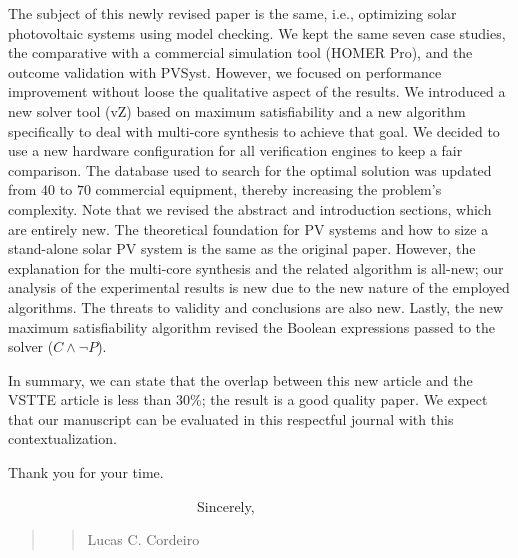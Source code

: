 \documentclass[11pt]{article}
\newcommand\vi{\vspace{\baselineskip}}
\begin{document}
The subject of this newly revised paper is the same, i.e., optimizing solar photovoltaic systems using model checking. We kept the same seven case studies, the comparative with a commercial simulation tool (HOMER Pro), and the outcome validation with PVSyst. However, we focused on performance improvement without loose the qualitative aspect of the results. We introduced a new solver tool (vZ) based on maximum satisfiability and a new algorithm specifically to deal with multi-core synthesis to achieve that goal. We decided to use a new hardware configuration for all verification engines to keep a fair comparison. The database used to search for the optimal solution was updated from $40$ to $70$ commercial equipment, thereby increasing the problem's complexity. Note that we revised the abstract and introduction sections, which are entirely new. The theoretical foundation for PV systems and how to size a stand-alone solar PV system is the same as the original paper. However, the explanation for the multi-core synthesis and the related algorithm is all-new; our analysis of the experimental results is new due to the new nature of the employed algorithms. The threats to validity and conclusions are also new. 
Lastly, the new maximum satisfiability algorithm revised the Boolean expressions passed to the solver ($C \wedge \neg P$). 

In summary, we can state that the overlap between this new article and the VSTTE article is less than 30\%; the result is a good quality paper. We expect that our manuscript can be evaluated in this respectful journal with this contextualization.

\vi
Thank you for your time.
\vi


\indent
~~~~~~~~~~~~~~~~~~~~~~~~~~~Sincerely,\\



\begin{quote}
\begin{quote}
\begin{flushright}



Lucas C. Cordeiro~~~~~~~
\end{flushright}
\end{quote}
\end{quote}


 
 
\end{document}
